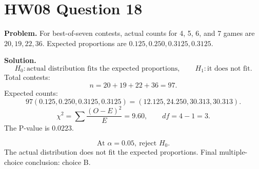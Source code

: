 \documentclass[11pt]{article}
\begin{document}
\section*{HW08 Question 18}

\textbf{Problem.} For best-of-seven contests, actual counts for 4, 5, 6, and 7 games are \(20,19,22,36\). Expected proportions are \(0.125,0.250,0.3125,0.3125\).

\textbf{Solution.}
\[
H_0:\text{actual distribution fits the expected proportions},\qquad
H_1:\text{it does not fit}.
\]
Total contests:
\[
n=20+19+22+36=97.
\]
Expected counts:
\[
97(0.125,0.250,0.3125,0.3125)=(12.125,24.250,30.313,30.313).
\]
\[
\chi^2=\sum\frac{(O-E)^2}{E}=9.60,\qquad df=4-1=3.
\]
The P-value is \(0.0223\).

\[
\boxed{\text{At }\alpha=0.05,\ \text{reject }H_0.}
\]
The actual distribution does not fit the expected proportions. Final multiple-choice conclusion: choice B.
\end{document}
